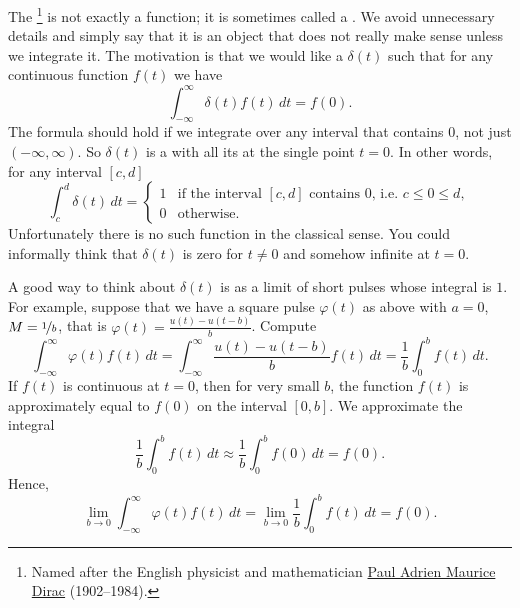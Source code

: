 The \emph{}%
\footnote{Named after the English physicist and mathematician
\href{https://en.wikipedia.org/wiki/Paul_Dirac}{Paul Adrien Maurice Dirac}
(1902--1984).}
is not exactly a function; it is sometimes called a
\emph{}.  We
avoid unnecessary details and simply say that it is an object
that does not really make sense unless we integrate it.  The motivation is
that we would like a  $\delta(t)$
such that 
for any continuous function $f(t)$ we have
\begin{equation*}
\boxed{~~
\int_{-\infty}^\infty \delta(t) f(t) \,dt = f(0) .
~~}
\end{equation*}
The formula should hold if we integrate over any interval that contains 0,
not just $(-\infty,\infty)$.
So $\delta(t)$ is a  
with all its  at the single point $t=0$.  In other words, for any
interval $[c,d]$
\begin{equation*}
\int_c^d \delta(t) \,dt = 
\begin{cases}
1 & \text{if the interval $[c,d]$ contains 0, i.e.\ } c \leq 0 \leq d, \\
0 & \text{otherwise.}
\end{cases}
\end{equation*}
Unfortunately there is no such function in the classical sense.  You could
informally think that $\delta(t)$ is zero for $t\not=0$ and somehow
infinite at $t=0$.

A good way to think about $\delta(t)$ is as a limit of short pulses
whose integral is $1$.  For example, suppose that
we have a square pulse $\varphi(t)$ as above with $a=0$,
$M=\nicefrac{1}{b}$, that is $\varphi(t) = \frac{u(t) - u(t-b)}{b}$.
Compute
\begin{equation*}
\int_{-\infty}^\infty \varphi(t) f(t) \,dt =
\int_{-\infty}^\infty \frac{u(t) - u(t-b)}{b} f(t) \,dt =
\frac{1}{b} \int_{0}^b f(t) \,dt .
\end{equation*}
If $f(t)$ is continuous at $t=0$, then
for very small $b$, the function $f(t)$ is approximately equal to $f(0)$ on
the interval $[0,b]$.  We approximate the integral
\begin{equation*}
\frac{1}{b} \int_{0}^b f(t) \,dt \approx
\frac{1}{b} \int_{0}^b f(0) \,dt = f(0) .
\end{equation*}
Hence,
\begin{equation*}
\lim_{b\to 0}
\int_{-\infty}^\infty \varphi(t) f(t) \,dt =
\lim_{b\to 0}
\frac{1}{b} \int_{0}^b f(t) \,dt  = f(0) .
\end{equation*}

